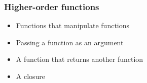 \documentclass[14pt,compress]{beamer}
\begin{document}
\begin{frame}[fragile]
  \frametitle{Higher-order functions}
  \begin{itemize}
  \item Functions that manipulate functions
  \item Passing a function as an argument
  \item A function that returns another function
  \item A closure
  \end{itemize}
\end{frame}
\end{document}
